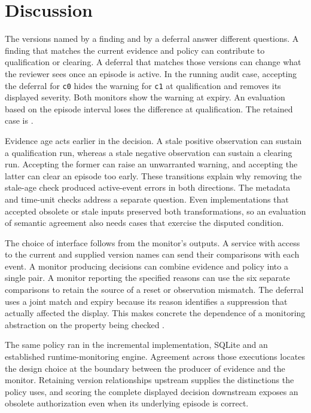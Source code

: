 \documentclass[preprint,11pt]{elsarticle}
\newcommand{\code}[1]{\texttt{#1}}
\begin{document}
\section{Discussion}
The versions named by a finding and by a deferral answer different questions. A finding that matches the current evidence and policy can contribute to qualification or clearing. A deferral that matches those versions can change what the reviewer sees once an episode is active. In the running audit case, accepting the deferral for \code{c0} hides the warning for \code{c1} at qualification and removes its displayed severity. Both monitors show the warning at expiry. An evaluation based on the episode interval loses the difference at qualification. The retained case is .

Evidence age acts earlier in the decision. A stale positive observation can sustain a qualification run, whereas a stale negative observation can sustain a clearing run. Accepting the former can raise an unwarranted warning, and accepting the latter can clear an episode too early. These transitions explain why removing the stale-age check produced active-event errors in both directions. The metadata and time-unit checks address a separate question. Even implementations that accepted obsolete or stale inputs preserved both transformations, so an evaluation of semantic agreement also needs cases that exercise the disputed condition.

The choice of interface follows from the monitor's outputs. A service with access to the current and supplied version names can send their comparisons with each event. A monitor producing decisions can combine evidence and policy into a single pair. A monitor reporting the specified reasons can use the six separate comparisons to retain the source of a reset or observation mismatch. The deferral uses a joint match and expiry because its reason identifies a suppression that actually affected the display. This makes concrete the dependence of a monitoring abstraction on the property being checked \cite{henzinger2022abstract,jevitha2024abstract}.

The same policy ran in the incremental implementation, SQLite and an established runtime-monitoring engine. Agreement across those executions locates the design choice at the boundary between the producer of evidence and the monitor. Retaining version relationships upstream supplies the distinctions the policy uses, and scoring the complete displayed decision downstream exposes an obsolete authorization even when its underlying episode is correct.
\end{document}
